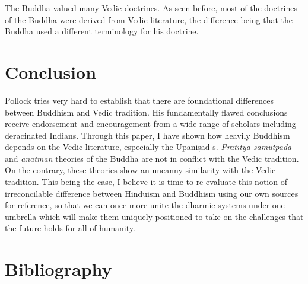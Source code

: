 The Buddha valued many Vedic doctrines. As seen before, most of the doctrines of the Buddha were derived from Vedic literature, the difference being that the Buddha used a different terminology for his doctrine.

\vspace{-.4cm}

\section*{Conclusion}

Pollock tries very hard to establish that there are foundational differences between Buddhism and Vedic tradition. His fundamentally flawed conclusions receive endorsement and encouragement from a wide range of scholars including deracinated Indians. Through this paper, I have shown how heavily Buddhism depends on the Vedic literature, especially the Upaniṣad-s. \textit{Pratītya-samutpāda} and \textit{anātman} theories of the Buddha are not in conflict with the Vedic tradition. On the contrary, these theories show an uncanny similarity with the Vedic tradition. This being the case, I believe it is time to re-evaluate this notion of irreconcilable difference between Hinduism and Buddhism using our own sources for reference, so that we can once more unite the dharmic systems under one umbrella which will make them uniquely positioned to take on the challenges that the future holds for all of humanity.


\section*{Bibliography}

